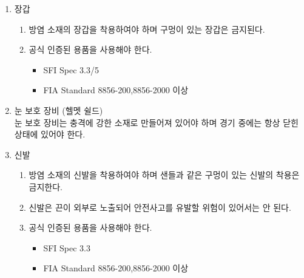 \documentclass[final,a4paper,10pt]{report}
\begin{document}
\begin{enumerate}
\begin{enumerate}
      \item\label{rule:formula-technical.driver-equipment.driving-suit.accepted-certification-standards} 공식 인증된 용품을 사용해야 한다.
        \begin{itemize}
          \item SFI 3.2A/5 (or higher ex: /10, /15, /20)
          \item FIA Standard 1986
          \item FIA Standard 8856-200,8856-2000 이상
        \end{itemize}
    \end{enumerate}

  \item\label{rule:formula-technical.driver-equipment.gloves} 장갑
    \begin{enumerate}
      \item\label{rule:formula-technical.driver-equipment.gloves.flame-resistant-no-holes} 방염 소재의 장갑을 착용하여야 하며 구멍이 있는 장갑은 금지된다.

      \item\label{rule:formula-technical.driver-equipment.gloves.accepted-certification-standards} 공식 인증된 용품을 사용해야 한다.
        \begin{itemize}
          \item SFI Spec 3.3/5
          \item FIA Standard 8856-200,8856-2000 이상
        \end{itemize}
    \end{enumerate}

  \item\label{rule:formula-technical.driver-equipment.eye-protection} 눈 보호 장비 (헬멧 쉴드)\\
    눈 보호 장비는 충격에 강한 소재로 만들어져 있어야 하며 경기 중에는 항상 닫힌 상태에 있어야 한다.

  \item\label{rule:formula-technical.driver-equipment.shoes} 신발
    \begin{enumerate}
      \item\label{rule:formula-technical.driver-equipment.shoes.flame-resistant-closed-shoes} 방염 소재의 신발을 착용하여야 하며 샌들과 같은 구멍이 있는 신발의 착용은 금지한다.
      \item\label{rule:formula-technical.driver-equipment.shoes.no-exposed-laces} 신발은 끈이 외부로 노출되어 안전사고를 유발할 위험이 있어서는 안 된다.
      \item\label{rule:formula-technical.driver-equipment.shoes.accepted-certification-standards} 공식 인증된 용품을 사용해야 한다.
        \begin{itemize}
          \item SFI Spec 3.3
          \item FIA Standard 8856-200,8856-2000 이상
        \end{itemize}
    \end{enumerate}


\end{enumerate}
\end{document}
